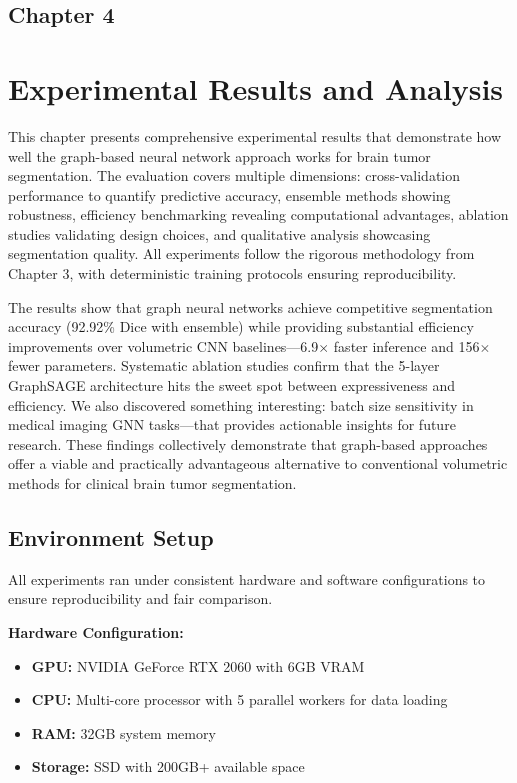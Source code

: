 \begin{center}
    \section*{\fontsize{20}{20}\selectfont Chapter 4}
\end{center}
\vspace{10mm}

\section{Experimental Results and Analysis}

This chapter presents comprehensive experimental results that demonstrate how well the graph-based neural network approach works for brain tumor segmentation. The evaluation covers multiple dimensions: cross-validation performance to quantify predictive accuracy, ensemble methods showing robustness, efficiency benchmarking revealing computational advantages, ablation studies validating design choices, and qualitative analysis showcasing segmentation quality. All experiments follow the rigorous methodology from Chapter 3, with deterministic training protocols ensuring reproducibility.

The results show that graph neural networks achieve competitive segmentation accuracy (92.92\% Dice with ensemble) while providing substantial efficiency improvements over volumetric CNN baselines—6.9$\times$ faster inference and 156$\times$ fewer parameters. Systematic ablation studies confirm that the 5-layer GraphSAGE architecture hits the sweet spot between expressiveness and efficiency. We also discovered something interesting: batch size sensitivity in medical imaging GNN tasks—that provides actionable insights for future research. These findings collectively demonstrate that graph-based approaches offer a viable and practically advantageous alternative to conventional volumetric methods for clinical brain tumor segmentation.


\subsection{Environment Setup}

All experiments ran under consistent hardware and software configurations to ensure reproducibility and fair comparison.

\textbf{Hardware Configuration:}
\begin{itemize}
    \item \textbf{GPU:} NVIDIA GeForce RTX 2060 with 6GB VRAM
    \item \textbf{CPU:} Multi-core processor with 5 parallel workers for data loading
    \item \textbf{RAM:} 32GB system memory
    \item \textbf{Storage:} SSD with 200GB+ available space
\end{itemize}

